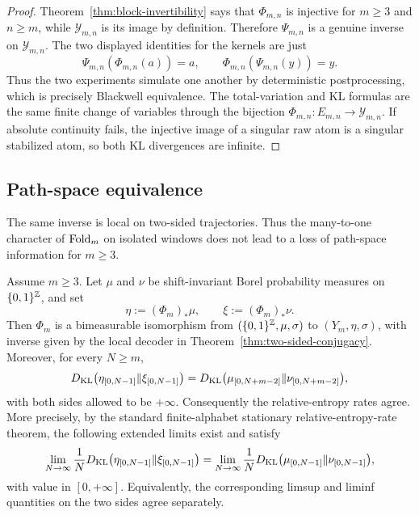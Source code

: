 \begin{proof}
Theorem~\ref{thm:block-invertibility} says that $\Phi_{m,n}$ is injective for
$m\ge3$ and $n\ge m$, while $\mathcal Y_{m,n}$ is its image by definition.
Therefore $\Psi_{m,n}$ is a genuine inverse on $\mathcal Y_{m,n}$.  The two
displayed identities for the kernels are just
\[
\Psi_{m,n}(\Phi_{m,n}(a))=a,\qquad
\Phi_{m,n}(\Psi_{m,n}(y))=y.
\]
Thus the two experiments simulate one another by deterministic postprocessing,
which is precisely Blackwell equivalence. The total-variation and KL formulas
are the same finite change of variables through the bijection
$\Phi_{m,n}:E_{m,n}\to\mathcal Y_{m,n}$. If absolute continuity fails, the
injective image of a singular raw atom is a singular stabilized atom, so both
KL divergences are infinite.
\end{proof}

\subsection{Path-space equivalence}

The same inverse is local on two-sided trajectories. Thus the many-to-one
character of $\mathrm{Fold}_m$ on isolated windows does not lead to a loss of
path-space information for $m\ge3$.

\begin{corollary}\label{cor:path-space-divergence}
Assume $m\ge3$.  Let $\mu$ and $\nu$ be shift-invariant Borel probability
measures on $\{0,1\}^{\mathbb{Z}}$, and set
\[
\eta:=(\Phi_m)_*\mu,\qquad \xi:=(\Phi_m)_*\nu .
\]
Then $\Phi_m$ is a bimeasurable isomorphism from
$(\{0,1\}^{\mathbb{Z}},\mu,\sigma)$ to $(Y_m,\eta,\sigma)$, with inverse given by the
local decoder in Theorem~\ref{thm:two-sided-conjugacy}.  Moreover, for every
$N\ge m$,
\[
D_{\mathrm{KL}}\bigl(\eta_{[0,N-1]}\|\xi_{[0,N-1]}\bigr)
=
D_{\mathrm{KL}}\bigl(\mu_{[0,N+m-2]}\|\nu_{[0,N+m-2]}\bigr),
\]
with both sides allowed to be $+\infty$. Consequently the relative-entropy
rates agree. More precisely, by the standard finite-alphabet stationary
relative-entropy-rate theorem, the following extended limits exist and
satisfy
\[
\lim_{N\to\infty}\frac1N
D_{\mathrm{KL}}\bigl(\eta_{[0,N-1]}\|\xi_{[0,N-1]}\bigr)
=
\lim_{N\to\infty}\frac1N
D_{\mathrm{KL}}\bigl(\mu_{[0,N-1]}\|\nu_{[0,N-1]}\bigr),
\]
with value in $[0,+\infty]$. Equivalently, the corresponding limsup and
liminf quantities on the two sides agree separately.
\end{corollary}

